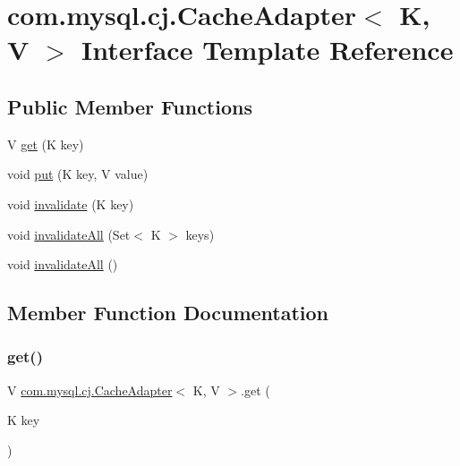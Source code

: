 \hypertarget{interfacecom_1_1mysql_1_1cj_1_1_cache_adapter}{}\section{com.\+mysql.\+cj.\+Cache\+Adapter$<$ K, V $>$ Interface Template Reference}
\label{interfacecom_1_1mysql_1_1cj_1_1_cache_adapter}
\subsection*{Public Member Functions}
\begin{DoxyCompactItemize}
\item 
V \mbox{\hyperlink{interfacecom_1_1mysql_1_1cj_1_1_cache_adapter_a4febd3fc8295c102d7162898531b9c05}{get}} (K key)
\item 
void \mbox{\hyperlink{interfacecom_1_1mysql_1_1cj_1_1_cache_adapter_a4f9009be8c604a82869b84dc545d06f8}{put}} (K key, V value)
\item 
void \mbox{\hyperlink{interfacecom_1_1mysql_1_1cj_1_1_cache_adapter_a6b1f13c49438687c5151165ee9e6533d}{invalidate}} (K key)
\item 
void \mbox{\hyperlink{interfacecom_1_1mysql_1_1cj_1_1_cache_adapter_a14cacba0c17fb6fb9883c65bcbe81c44}{invalidate\+All}} (Set$<$ K $>$ keys)
\item 
void \mbox{\hyperlink{interfacecom_1_1mysql_1_1cj_1_1_cache_adapter_afccea08d532646e291f13af43ca85db0}{invalidate\+All}} ()
\end{DoxyCompactItemize}


\subsection{Member Function Documentation}
\mbox{\label{interfacecom_1_1mysql_1_1cj_1_1_cache_adapter_a4febd3fc8295c102d7162898531b9c05}} 
\subsubsection{\texorpdfstring{get()}{get()}}
{\footnotesize\ttfamily V \mbox{\hyperlink{interfacecom_1_1mysql_1_1cj_1_1_cache_adapter}{com.\+mysql.\+cj.\+Cache\+Adapter}}$<$ K, V $>$.get (\begin{DoxyParamCaption}\item[{K}]{key }\end{DoxyParamCaption})}

